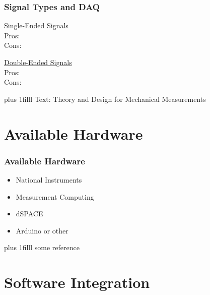 \documentclass[fleqn]{beamer} %
\newcommand{\sectiontitleI}{Signal Types and DAQ}
\newcommand{\sectiontitleII}{Available Hardware}
\newcommand{\sectiontitleIII}{Software Integration}
\newcommand{\btVFill}{\vskip0pt plus 1filll}
\begin{document}
	\begin{frame}[label=sectionI] \small
	\frametitle{\sectiontitleI}
	
	\begin{multicols}{2}
		\underline{Single-Ended Signals} \vspace{20mm}\\
		
		Pros:\vspace{10mm}\\
		Cons:
		
		\underline{Double-Ended Signals} \vspace{20mm}\\
		
		Pros:\vspace{10mm}\\
		Cons:
		
		
	\end{multicols}
	\btVFill
	\tiny{Text: Theory and Design for Mechanical Measurements}
\end{frame}

\section{\sectiontitleII}	

\begin{frame}[label=sectionII] \small
\frametitle{\sectiontitleII}
\bigskip

\begin{itemize}
	\item National Instruments \vspace{6mm}\\
	
	\item Measurement Computing  \vspace{6mm}\\
	
	\item dSPACE  \vspace{6mm}\\
	
	\item Arduino or other 
	
\end{itemize}

\btVFill
\tiny{some reference}		

\end{frame}
	
\section{\sectiontitleIII}	
\end{document}

